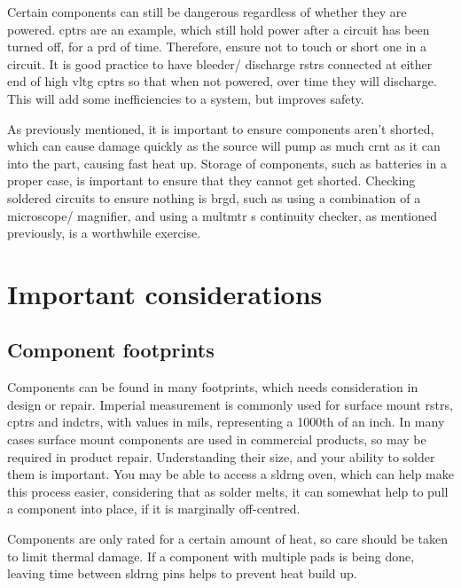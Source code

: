 \documentclass[a4paper,11pt]{report}
\begin{document}
Certain components can still be dangerous regardless of whether they are powered. \gls{cptr}s are an example, which still hold power after a circuit has been turned off, for a \gls{prd} of time. Therefore, ensure not to touch or short one in a circuit. It is good practice to have bleeder/ discharge \gls{rstr}s connected at either end of high \gls{vltg} \gls{cptr}s so that when not powered, over time they will discharge. This will add some inefficiencies to a system, but improves safety.

As previously mentioned, it is important to ensure components aren't shorted, which can cause damage quickly as the source will pump as much \gls{crnt} as it can into the part, causing fast heat up. Storage of components, such as batteries in a proper case, is important to ensure that they cannot get shorted. Checking soldered circuits to ensure nothing is \gls{brgd}, such as using a combination of a microscope/ magnifier, and using a \gls{multmtr} s continuity checker, as mentioned previously, is a worthwhile exercise.

\pagebreak

\section{Important considerations}

\vspace*{1\baselineskip}

\subsection{Component footprints}

Components can be found in many footprints, which needs consideration in design or repair. Imperial measurement is commonly used for surface mount \gls{rstr}s, \gls{cptr}s and \gls{indctr}s, with values in mils, representing a 1000th of an inch. In many cases surface mount components are used in commercial products, so may be required in product repair. Understanding their size, and your ability to solder them is important. You may be able to access a \gls{sldrng} oven, which can help make this process easier, considering that as solder melts, it can somewhat help to pull a component into place, if it is marginally off-centred.

Components are only rated for a certain amount of heat, so care should be taken to limit thermal damage. If a component with multiple pads is being done, leaving time between \gls{sldrng} pins helps to prevent heat build up.
\end{document}
